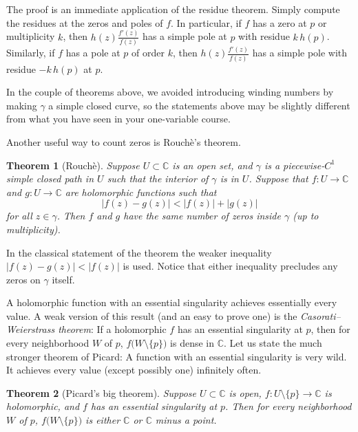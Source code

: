 \documentclass[12pt,openany]{book}
\newcommand{\sabs}[1]{\lvert {#1} \rvert}
\newcommand{\C}{{\mathbb{C}}}
\newcommand{\myindex}[1]{#1\index{#1}}
\theoremstyle{plain}
\newtheorem{thm}{Theorem}[section]
\theoremstyle{remark}
\theoremstyle{definition}
\theoremstyle{exercise}
\theoremstyle{example}
\begin{document}
The proof is an immediate application of the residue theorem.  Simply
compute the residues at the zeros and poles of $f$.  In particular,
if $f$ has a zero at $p$ or multiplicity $k$, then $h(z) \frac{f'(z)}{f(z)}$
has a simple pole
at $p$ with residue $k\, h(p)$.  Similarly, if $f$ has a pole at $p$ of
order $k$,
then $h(z) \frac{f'(z)}{f(z)}$ has a simple pole with residue $-k\, h(p)$ at $p$.

In the couple of theorems above,
we avoided introducing winding numbers by making $\gamma$ a simple closed curve,
so the statements above may be slightly different from what you have seen in
your one-variable course.

Another useful way to count zeros is Rouch\`e's theorem.

\begin{thm}[Rouch\`e]\label{thm:onevarrouche}
Suppose $U \subset \C$ is an open set, and $\gamma$ is a piecewise-$C^1$
simple closed path in $U$ such that the interior of $\gamma$ is in $U$.
Suppose that $f \colon U \to \C$ and $g \colon U \to \C$
are holomorphic functions such that
\begin{equation*}
\sabs{f(z)-g(z)} < \sabs{f(z)}+\sabs{g(z)}
\end{equation*}
for all $z \in \gamma$.  Then $f$ and $g$
have the same number of zeros
inside $\gamma$ (up to multiplicity).
\end{thm}

In the classical statement of the theorem the weaker
inequality $\sabs{f(z)-g(z)} < \sabs{f(z)}$ is used.
Notice that either inequality precludes any zeros on $\gamma$ itself.

A holomorphic function with an essential singularity achieves essentially
every value.  A weak version of this result (and an easy to prove one)
is the \emph{\myindex{Casorati--Weierstrass theorem}}:
If a holomorphic $f$ has an essential singularity at $p$,
then for every neighborhood $W$ of $p$, $f\bigl(W \setminus \{p\}\bigr)$ is dense in
$\C$.  Let us state the much stronger theorem of Picard:
A function with an essential singularity is very wild.
It achieves every value (except possibly one) infinitely often.

\begin{thm}[Picard's big theorem]
Suppose $U \subset \C$ is open, $f \colon U \setminus \{ p \} \to \C$
is holomorphic, and $f$ has an essential singularity at $p$.  Then for every
neighborhood $W$ of $p$, $f\bigl(W \setminus \{ p \}\bigr)$ is either $\C$
or $\C$ minus a point.
\end{thm}
\end{document}
